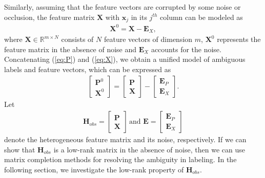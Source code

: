 \documentclass[10pt,journal,compsoc]{IEEEtran}
\begin{document}
Similarly, assuming that the feature vectors are corrupted by some noise or occlusion, the feature matrix $\mathbf{X}$ with $\mathbf{x}_j$ in its $j^{th}$ column can be modeled as
\begin{equation}
\begin{aligned}
\mathbf{X}^0  = \mathbf{X} - \mathbf{E}_X, \label{eq:X}
\end{aligned}
\end{equation}
\textcolor[rgb]{0.00,0.00,0.00}{where $\mathbf{X} \in \mathbb{R}^{m \times N}$ consists of $N$ feature vectors of dimension $m$, $\mathbf{X}^0$ represents the feature matrix in the absence of noise and $\mathbf{E}_X$ accounts for the noise. }  Concatenating (\ref{eq:P}) and (\ref{eq:X}), we obtain a unified model of ambiguous labels and feature vectors, which can be expressed as
\begin{equation}
\begin{aligned}
\begin{bmatrix}
\mathbf{P}^0 \\
\mathbf{X}^0
\end{bmatrix}
=
\begin{bmatrix}
\mathbf{P} \\
\mathbf{X}
\end{bmatrix}
-
\begin{bmatrix}
\mathbf{E}_P \\
\mathbf{E}_X
\end{bmatrix}.
\end{aligned}\label{eq:united_model}
\end{equation}
Let
\begin{equation}
\begin{aligned}
\mathbf{H}_{obs} = \begin{bmatrix}
\mathbf{P} \\
\mathbf{X}
\end{bmatrix} \, \mathrm{and} \,\, \mathbf{E} = \begin{bmatrix}
\mathbf{E}_P \\
\mathbf{E}_X
\end{bmatrix}
\end{aligned}
\end{equation}
denote the heterogeneous feature matrix and its noise, respectively.  If we can show that $\mathbf{H}_{obs}$ is a low-rank matrix in the absence of noise, then we can use matrix completion methods for resolving the ambiguity in labeling.  In the following section, we investigate the low-rank property of $\mathbf{H}_{obs}.$
\end{document}
